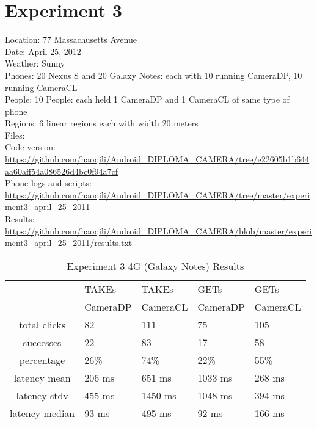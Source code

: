 \section{Experiment 3}

Location: 77 Massachusetts Avenue\\
Date: April 25, 2012\\
Weather: Sunny\\
Phones: 20 Nexus S and 20 Galaxy Notes: each with 10 running CameraDP, 10 running CameraCL\\
People: 10 People: each held 1 CameraDP and 1 CameraCL of same type of phone\\
Regions: 6 linear regions each with width 20 meters\\
Files:\\
Code version: {\url{https://github.com/haoqili/Android_DIPLOMA_CAMERA/tree/e22605b1b644aa60aff54a086526d4bc0f94a7cf}}\\
Phone logs and scripts: {\url{https://github.com/haoqili/Android_DIPLOMA_CAMERA/tree/master/experiment3_april_25_2011}}\\ 
Results: {\url{https://github.com/haoqili/Android_DIPLOMA_CAMERA/blob/master/experiment3_april_25_2011/results.txt}}\\

\begin{table}[htb]
\begin{scriptsize} 
\caption{Experiment 3 4G (Galaxy Notes) Results} 
\label{table:exp-3-4g-results}
 \begin{center}
 \begin{tabular}{| c | p{1.5cm} | p{1.5cm} | p{1.5cm} | p{1.4cm} |}
  \hline
  & TAKEs & TAKEs & GETs & GETs \\
  & CameraDP & CameraCL & CameraDP & CameraCL \\
  \hline
  total clicks & 82 & 111 & 75 & 105 \\
  \hline
  successes & 22 & 83 & 17 & 58 \\
  \hline
  percentage & 26\% & 74\% & 22\% & 55\% \\
  \hline
  latency mean & 206 ms & 651 ms & 1033 ms & 268 ms \\
  \hline
  latency stdv & 455 ms &1450 ms &1048 ms & 394 ms \\
  \hline
  latency median & 93 ms & 495 ms & 92 ms & 166 ms \\
  \hline
  \end{tabular}
  \end{center}
\end{scriptsize}
\end{table}

